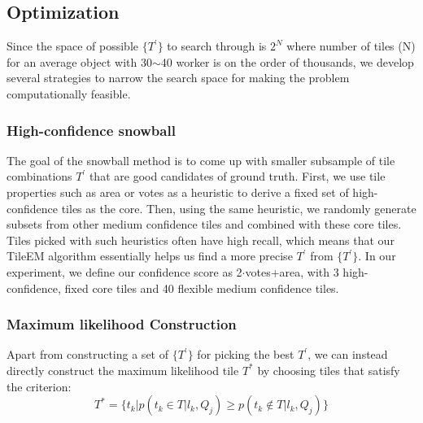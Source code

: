 \documentclass[letterpaper]{article} %
\begin{document}
\subsection{Optimization}
Since the space of possible $\{T^{\prime}\}$ to search through is $2^{N}$ where number of tiles (N) for an average object with 30$\sim$40 worker is on the order of thousands, we develop several strategies to narrow the search space for making the problem computationally feasible. 
\subsubsection{High-confidence snowball}
The goal of the snowball method is to come up with smaller subsample of tile combinations $T^\prime$ that are good candidates of ground truth. First, we use tile properties such as area or votes as a heuristic to derive a fixed set of high-confidence tiles as the core. Then, using the same heuristic, we randomly generate subsets from other medium confidence tiles and combined with these core tiles. Tiles picked with such heuristics often have high recall, which means that our TileEM algorithm essentially helps us find a more precise $T^{\prime}$ from $\{T^{\prime}\}$. In our experiment, we define our confidence score as 2$\cdot$votes+area, with 3 high-confidence, fixed core tiles and 40 flexible medium confidence tiles. 
\subsubsection{Maximum likelihood Construction}
Apart from constructing a set of  $\{T^{\prime}\}$ for picking the best  $T^{\prime}$, we can instead directly construct the maximum likelihood tile $T^*$ by choosing tiles that satisfy the criterion: 
\begin{equation}
T^* = \{t_k|p(t_k\in T|l_k,Q_j)\geq p(t_k\notin T|l_k,Q_j)\}
\end{equation}
\end{document}
